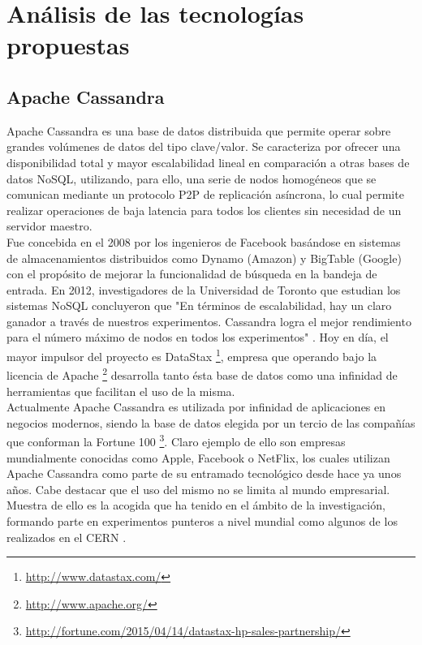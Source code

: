 
\pagestyle{fancy}

\chapter{Análisis de las tecnologías propuestas}
\label{analisis_tecnologias}

\section{Apache Cassandra}

Apache Cassandra es una base de datos distribuida que permite operar sobre grandes volúmenes de datos del tipo clave/valor. Se caracteriza por ofrecer una  disponibilidad total y mayor escalabilidad lineal en comparación a otras bases de datos NoSQL, utilizando, para ello, una serie de nodos homogéneos que se comunican mediante un protocolo P2P de replicación asíncrona, lo cual permite realizar operaciones de baja latencia para todos los clientes sin necesidad de un servidor maestro.\\

Fue concebida en el 2008 por los ingenieros de Facebook basándose en sistemas de almacenamientos distribuidos como Dynamo (Amazon) \cite{decandia2007dynamo} y BigTable (Google) \cite{chang2008bigtable} con el propósito de mejorar la funcionalidad de búsqueda en la bandeja de entrada. En 2012, investigadores de la Universidad de Toronto que estudian los sistemas NoSQL concluyeron que "En términos de escalabilidad, hay un claro ganador a través de nuestros experimentos. Cassandra logra el mejor rendimiento para el número máximo de nodos en todos los experimentos" \cite{rabl2012solving}. Hoy en día, el mayor impulsor del proyecto es DataStax \footnote{\url{http://www.datastax.com/}}, empresa que operando bajo la licencia de Apache \footnote{\url{http://www.apache.org/}} desarrolla tanto ésta base de datos como una infinidad de herramientas que facilitan el uso de la misma.\\

Actualmente Apache Cassandra es utilizada por infinidad de aplicaciones en negocios modernos, siendo la base de datos elegida por un tercio de las compañías que conforman la Fortune 100 \footnote{\url{http://fortune.com/2015/04/14/datastax-hp-sales-partnership/}}. Claro ejemplo de ello son empresas mundialmente conocidas como Apple, Facebook o NetFlix, los cuales utilizan Apache Cassandra como parte de su entramado tecnológico desde hace ya unos años. Cabe destacar que el uso del mismo no se limita al mundo empresarial. Muestra de ello es la acogida que ha tenido en el ámbito de la investigación, formando parte en experimentos punteros a nivel mundial como algunos de los realizados en el CERN \cite{sicoe2012persistent}.\\

